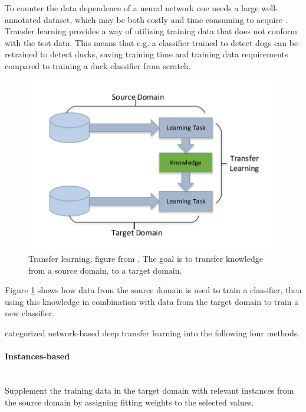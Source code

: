 \vspace{3mm}

\noindent
To counter the data dependence of a neural network one needs a large well-annotated dataset, which may be both costly and time consuming to acquire \citep{TransferLearning}. Transfer learning provides a way of utilizing training data that does not conform with the test data. This means that e.g. a classifier trained to detect dogs can be retrained to detect ducks, saving training time and training data requirements compared to training a duck classifier from scratch. 



\begin{figure}[h!]
    \centering
    \includegraphics[scale=0.4]{fig/transfer_learning.png}
    \caption{Transfer learning, figure from \citep{TransferLearning2}. The goal is to transfer knowledge from a source domain, to a target domain.}
    \label{fig:transfer_learning}
\end{figure}

\noindent
Figure \ref{fig:transfer_learning} shows how data from the source domain is used to train a classifier, then using this knowledge in combination with data from the target domain to train a new classifier. 

\vspace{3mm}

\noindent
\citep{TransferLearning2} categorized network-based deep transfer learning into the following four methods.

\paragraph{Instances-based}\mbox{}\\
Supplement the training data in the target domain with relevant instances from the source domain by assigning fitting weights to the selected values.

